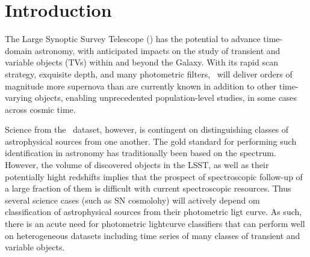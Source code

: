 \section{Introduction}
\label{sec:intro}


The Large Synoptic Survey Telescope (\lsst) has the potential to advance time-domain astronomy, with anticipated impacts on the study of transient and variable objects (TVs) within and beyond the Galaxy.
With its rapid scan strategy, exquisite depth, and many photometric filters, \lsst\ will deliver orders of magnitude more supernova than are currently known in addition to  other time-varying objects, enabling unprecedented population-level studies, in some cases across cosmic time.

Science from the \lsst\ dataset, however, is contingent on distinguishing classes of astrophysical sources
 from one another. The gold standard for performing such identification in astronomy has traditionally been
based on the spectrum. However, the volume of discovered objects in the LSST, as well as their potentially hight redshifts implies that the prospect of spectroscopic follow-up of a large fraction of them is difficult
with current spectroscopic resources. Thus several science cases (such as SN cosmolohy) will actively depend om classification of astrophysical sources  from their photometric ligt curve. 
As such, there is an acute need for photometric lightcurve classifiers that can perform well on heterogeneous datasets including time series of many classes of transient and variable objects.

